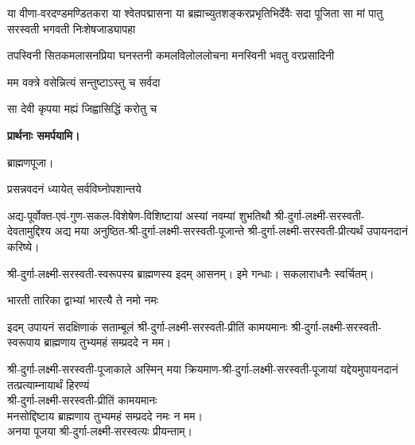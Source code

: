 \begin{center}

{या वीणा-वरदण्डमण्डितकरा या श्वेतपद्मासना}
{या ब्रह्माच्युतशङ्करप्रभृतिभिर्देवैः सदा पूजिता}
{सा मां पातु सरस्वती भगवती निःशेषजाड्यापहा}

{तपस्विनी सितकमलासनप्रिया}
{घनस्तनी कमलविलोललोचना}
{मनस्विनी भवतु वरप्रसादिनी}

{मम वक्त्रे वसेन्नित्यं सन्तुष्टाऽस्तु च सर्वदा}

{सा देवी कृपया मह्यं जिह्वासिद्धिं करोतु च}

\textbf{प्रार्थनाः समर्पयामि।}

ब्राह्मणपूजा।

{प्रसन्नवदनं ध्यायेत् सर्वविघ्नोपशान्तये}

अद्य-पूर्वोक्त-एवं-गुण-सकल-विशेषेण-विशिष्टायां अस्यां नवम्यां शुभतिथौ श्री-दुर्गा-लक्ष्मी-सरस्वती-देवतामुद्दिश्य अद्य मया अनुष्ठित-श्री-दुर्गा-लक्ष्मी-सरस्वती-पूजान्ते
श्री-दुर्गा-लक्ष्मी-सरस्वती-प्रीत्यर्थं उपायनदानं करिष्ये।

श्री-दुर्गा-लक्ष्मी-सरस्वती-स्वरूपस्य ब्राह्मणस्य इदम् आसनम्। इमे गन्धाः। सकलाराधनैः स्वर्चितम्।

{भारती तारिका द्वाभ्यां भारत्यै ते नमो नमः}

इदम् उपायनं सदक्षिणाकं सताम्बूलं श्री-दुर्गा-लक्ष्मी-सरस्वती-प्रीतिं कामयमानः श्री-दुर्गा-लक्ष्मी-सरस्वती-स्वरूपाय ब्राह्मणाय तुभ्यमहं सम्प्रददे न मम।

\hiranyagarbha

श्री-दुर्गा-लक्ष्मी-सरस्वती-पूजाकाले अस्मिन् मया क्रियमाण-श्री-दुर्गा-लक्ष्मी-सरस्वती-पूजायां यद्देयमुपायनदानं तत्प्रत्याम्नायार्थं हिरण्यं\\
श्री-दुर्गा-लक्ष्मी-सरस्वती-प्रीतिं कामयमानः\\
मनसोद्दिष्टाय ब्राह्मणाय तुभ्यमहं सम्प्रददे नमः न मम।\\
अनया पूजया श्री-दुर्गा-लक्ष्मी-सरस्वत्यः प्रीयन्ताम्।
\end{center}

\kshama

\closesub



\closesection